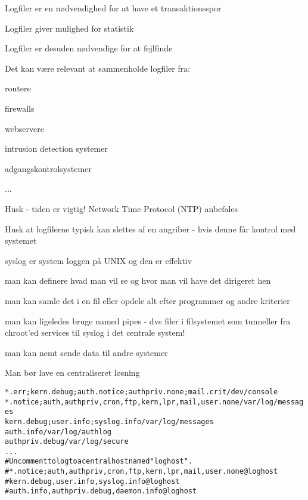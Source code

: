 \documentclass[Screen16to9,17pt]{foils}
\begin{document}
\begin{list1}
\item Logfiler er en nødvendighed for at have et transaktionsspor
\item Logfiler giver mulighed for statistik
\item Logfiler er desuden nødvendige for at fejlfinde
\item Det kan være relevant at sammenholde logfiler fra:
\begin{list2}
\item routere
\item firewalls
\item webservere
\item intrusion detection systemer
\item adgangskontrolsystemer
\item ...
\end{list2}
\item Husk - tiden er vigtig! Network Time Protocol (NTP) anbefales
\item Husk at logfilerne typisk kan slettes af en angriber -
  hvis denne får kontrol med systemet
\end{list1}


\begin{list1}
\item syslog er system loggen på UNIX og den er effektiv
  \begin{list2}
\item man kan definere hvad man vil se og hvor man vil have det
  dirigeret hen
\item man kan samle det i en fil eller opdele alt efter programmer og
  andre kriterier
\item man kan ligeledes bruge named pipes - dvs filer i filsystemet
  som tunneller fra chroot'ed services til syslog i det centrale system!
\item man kan nemt sende data til andre systemer
  \end{list2}
\item Man bør lave en centraliseret løsning
\end{list1}

\begin{alltt}
\small
*.err;kern.debug;auth.notice;authpriv.none;mail.crit    /dev/console
*.notice;auth,authpriv,cron,ftp,kern,lpr,mail,user.none /var/log/messages
kern.debug;user.info;syslog.info                        /var/log/messages
auth.info                                               /var/log/authlog
authpriv.debug                                          /var/log/secure
...
# Uncomment to log to a central host named "loghost".
#*.notice;auth,authpriv,cron,ftp,kern,lpr,mail,user.none        @loghost
#kern.debug,user.info,syslog.info                               @loghost
#auth.info,authpriv.debug,daemon.info                           @loghost
\end{alltt}
\end{document}
